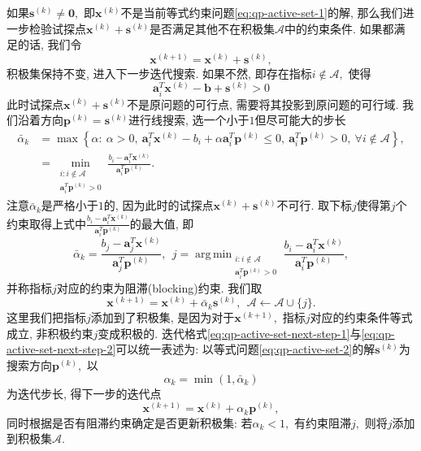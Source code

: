 \documentclass{SBCbookchapter}
\newcommand{\V}[1]{{\bm{#1}}}
\DeclareMathOperator*{\argmin}{arg\,min}
\numberwithin{equation}{section}
\begin{document}
如果$\V{s}^{(k)} \neq \V{0},$ 即$\V{x}^{(k)}$不是当前等式约束问题\eqref{eq:qp-active-set-1}的解, 那么我们进一步检验试探点$\V{x}^{(k)} + \V{s}^{(k)}$是否满足其他不在积极集$\mathcal{A}$中的约束条件. 如果都满足的话, 我们令
\begin{equation}
\label{eq:qp-active-set-next-step-1}
\V{x}^{(k+1)} = \V{x}^{(k)} + \V{s}^{(k)},
\end{equation}
积极集保持不变, 进入下一步迭代搜索. 如果不然, 即存在指标$i \not\in \mathcal{A},$ 使得
\begin{equation*}
\V{a}_i^T \V{x}^{(k)} - \V{b} + \V{s}^{(k)} > 0
\end{equation*}
此时试探点$\V{x}^{(k)} + \V{s}^{(k)}$不是原问题的可行点, 需要将其投影到原问题的可行域. 我们沿着方向$\V{p}^{(k)} = \V{s}^{(k)}$进行线搜索, 选一个小于$1$但尽可能大的步长
\begin{equation}
\label{eq:qp-active-set-step-len-1}
\begin{aligned}
\bar{\alpha}_k & = \max \left\{ \alpha : ~ \alpha > 0, ~ \V{a}_i^T \V{x}^{(k)} - b_i + \alpha \V{a}_i^T \V{p}^{(k)} \leqslant 0, ~ \V{a}_i^T \V{p}^{(k)} > 0, ~ \forall i \not\in \mathcal{A} \right\}, \\
& = \min_{\substack{i: i \not\in \mathcal{A} \\ \V{a}_i^T \V{p}^{(k)} > 0}} \frac{b_i - \V{a}_i^T \V{x}^{(k)}}{\V{a}_i^T \V{p}^{(k)}}.
\end{aligned}
\end{equation}
注意$\bar{\alpha}_k$是严格小于$1$的, 因为此时的试探点$\V{x}^{(k)} + \V{s}^{(k)}$不可行. 取下标$j$使得第$j$个约束取得上式中$\frac{b_i - \V{a}_i^T \V{x}^{(k)}}{\V{a}_i^T \V{p}^{(k)}}$的最大值, 即
\begin{equation}
\label{eq:qp-active-set-step-len-2}
\bar{\alpha}_k = \frac{b_j - \V{a}_j^T \V{x}^{(k)}}{\V{a}_j^T \V{p}^{(k)}}, ~~ j = \argmin_{\substack{i: i \not\in \mathcal{A} \\ \V{a}_i^T \V{p}^{(k)} > 0}} \frac{b_i - \V{a}_i^T \V{x}^{(k)}}{\V{a}_i^T \V{p}^{(k)}},
\end{equation}
并称指标$j$对应的约束为阻滞(blocking)约束. 我们取
\begin{equation}
\label{eq:qp-active-set-next-step-2}
\V{x}^{(k+1)} = \V{x}^{(k)} + \bar{\alpha}_k \V{s}^{(k)}, ~~ \mathcal{A} \gets \mathcal{A} \cup \{ j \}.
\end{equation}
这里我们把指标$j$添加到了积极集, 是因为对于$\V{x}^{(k+1)},$ 指标$j$对应的约束条件等式成立, 非积极约束$j$变成积极的. 迭代格式\eqref{eq:qp-active-set-next-step-1}与\eqref{eq:qp-active-set-next-step-2}可以统一表述为: 以等式问题\eqref{eq:qp-active-set-2}的解$\V{s}^{(k)}$为搜索方向$\V{p}^{(k)},$ 以
\begin{equation}
\label{eq:qp-active-set-step-len-uniform}
\alpha_k = \min (1, \bar{\alpha}_k)
\end{equation}
为迭代步长, 得下一步的迭代点
\begin{equation}
\label{eq:qp-active-set-next-step-uniform}
\V{x}^{(k+1)} = \V{x}^{(k)} + \alpha_k \V{p}^{(k)},
\end{equation}
同时根据是否有阻滞约束确定是否更新积极集: 若$\alpha_k < 1,$ 有约束阻滞$j,$ 则将$j$添加到积极集$\mathcal{A}.$
\end{document}
